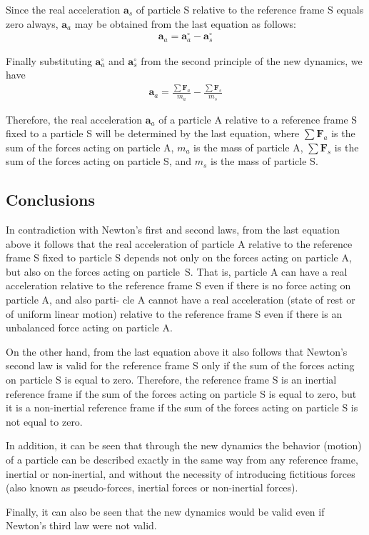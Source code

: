 \documentclass[11pt]{article}
\newcommand{\vA}{\mathbf{a}}
\newcommand{\vF}{\mathbf{F}}
\newcommand{\mM}{m}
\newcommand{\ra}{_a}
\newcommand{\rs}{_s}
\begin{document}
\newpage

\par Since the real acceleration $\vA\rs$ of particle S relative to the reference frame S equals zero always, $\vA\ra$ may be obtained from the last equation as follows:
\begin{eqnarray*}
\vA\ra = \vA^{\circ}\ra - \vA^{\circ}\rs
\end{eqnarray*}
\par Finally substituting $\vA^{\circ}\ra$ and $\vA^{\circ}\rs$ from the second principle of the new dynamics, we have
\begin{eqnarray*}
\vA\ra = \frac{\sum \vF\ra}{\mM\ra} - \frac{\sum \vF\rs}{\mM\rs}
\end{eqnarray*}
\par Therefore, the real acceleration $\vA\ra$ of a particle A relative to a reference frame S fixed to a particle S will be determined by the last equation, where $\sum \vF\ra$ is the sum of the forces acting on particle A, $\mM\ra$ is the mass of particle A, $\sum \vF\rs$ is the sum of the forces acting on particle S, and $\mM\rs$ is the mass of particle S.

\vspace{-0.6em}

{\centering\subsection*{Conclusions}}

\par In contradiction with Newton's first and second laws, from the last equation above it follows that the real acceleration of particle A relative to the reference frame S fixed to particle S depends not only on the forces acting on particle A, but also on the forces acting on \hbox {particle S}. That is, particle A can have a real acceleration relative to the reference frame S even if there is no force acting on particle A, and also parti- cle A cannot have a real acceleration (state of rest or of uniform linear motion) relative to the reference frame S even if there is an unbalanced force acting on particle A.
\medskip
\par On the other hand, from the last equation above it also follows that Newton's second law is valid for the reference frame S only if the sum of the forces acting on particle S is equal to zero. Therefore, the reference frame S is an inertial reference frame if the sum of the forces acting on particle S is equal to zero, but it is a non-inertial reference frame if the sum of the forces acting on particle S is not equal to zero.
\medskip
\par In addition, it can be seen that through the new dynamics the behavior (motion) of a particle can be described exactly in the same way from any reference frame, inertial or non-inertial, and without the necessity of introducing fictitious forces (also known as pseudo-forces, \hbox {inertial} forces or non-inertial forces).
\medskip
\par Finally, it can also be seen that the new dynamics would be valid even if Newton's third law were not valid.
\end{document}
